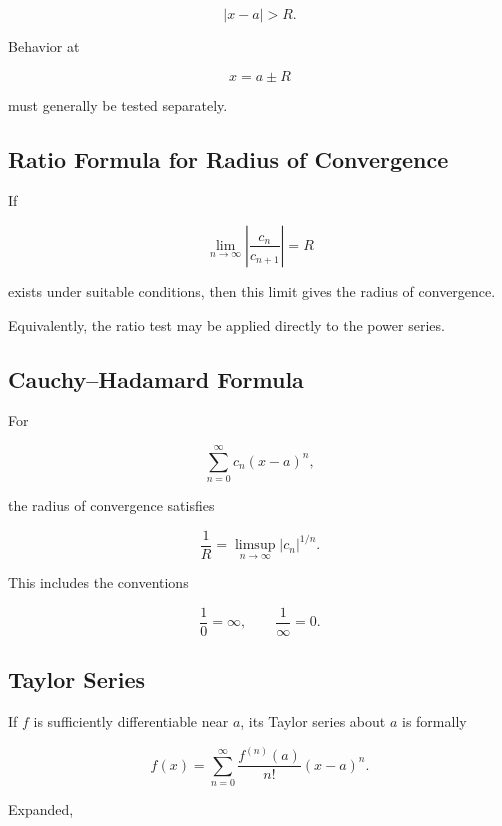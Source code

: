 \[
\boxed{
|x-a|>R.
}
\]

Behavior at

\[
x=a\pm R
\]

must generally be tested separately.

\subsection{Ratio Formula for Radius of Convergence}
\label{subsec:ratio-radius-convergence}

If

\[
\lim_{n\to\infty}
\left|
\frac{c_n}{c_{n+1}}
\right|
=
R
\]

exists under suitable conditions, then this limit gives the radius of
convergence.

Equivalently, the ratio test may be applied directly to the power series.

\subsection{Cauchy--Hadamard Formula}
\label{subsec:cauchy-hadamard-reference}

For

\[
\sum_{n=0}^{\infty}c_n(x-a)^n,
\]

the radius of convergence satisfies

\[
\boxed{
\frac{1}{R}
=
\limsup_{n\to\infty}
|c_n|^{1/n}.
}
\]

This includes the conventions

\[
\frac{1}{0}=\infty,
\qquad
\frac{1}{\infty}=0.
\]

\subsection{Taylor Series}
\label{subsec:taylor-series-reference}

If \(f\) is sufficiently differentiable near \(a\), its Taylor series about
\(a\) is formally

\[
\boxed{
f(x)
=
\sum_{n=0}^{\infty}
\frac{
f^{(n)}(a)
}{
n!
}
(x-a)^n.
}
\]

Expanded,

